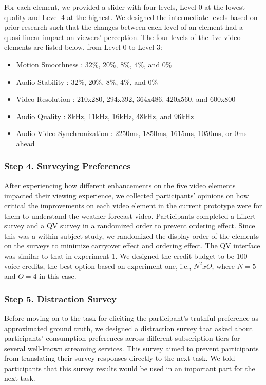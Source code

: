 For each element, we provided a slider with four levels, Level 0 at the lowest quality and Level 4 at the highest. We designed the intermediate levels based on prior research such that the changes between each level of an element had a quasi-linear impact on viewers' perception. The four levels of the five video elements are listed below, from Level 0 to Level 3:
\begin{itemize}
    \item Motion Smoothness \cite{huynh2008temporal}: 32\%, 20\%, 8\%, 4\%, and 0\%
    \item Audio Stability \cite{hardman1998successful}: 32\%, 20\%, 8\%, 4\%, and 0\%
    \item Video Resolution \cite{knoche2005can}: 210x280, 294x392, 364x486, 420x560, and 600x800 
    \item Audio Quality \cite{knoche2008low, noll1993wideband}: 8kHz, 11kHz, 16kHz, 48kHz, and 96kHz
    \item Audio-Video Synchronization \cite{steinmetz1996human}: 2250ms, 1850ms,  1615ms, 1050ms, or 0ms ahead
\end{itemize}



\subsubsection{Step 4. Surveying Preferences}
After experiencing how different enhancements on the five video elements impacted their viewing experience, we collected participants' opinions on how critical the improvements on each video element in the current prototype were for them to understand the weather forecast video. Participants completed a Likert survey and a QV survey in a randomized order to prevent ordering effect. Since this was a within-subject study, we randomized the display order of the elements on the surveys to minimize carryover effect and ordering effect. The QV interface was similar to that in experiment 1. We designed the credit budget to be 100 voice credits, the best option based on experiment one, i.e., $N^2 x O$, where $N=5$ and $O=4$ in this case.

\subsubsection{Step 5. Distraction Survey}
Before moving on to the task for eliciting the participant's truthful preference as approximated ground truth, we designed a distraction survey that asked about participants' consumption preferences across different subscription tiers for several well-known streaming services. This survey aimed to prevent participants from translating their survey responses directly to the next task. We told participants that this survey results would be used in an important part for the next task.

